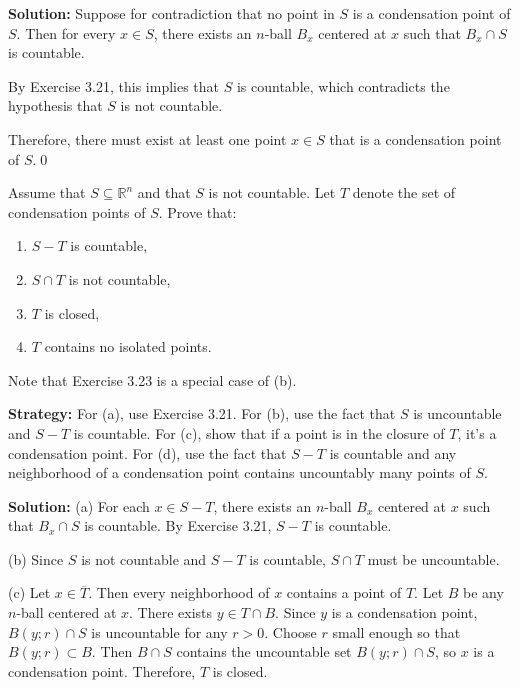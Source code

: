 \bigskip\noindent\textbf{Solution:} Suppose for contradiction that no point in $S$ is a condensation point of $S$. Then for every $x \in S$, there exists an $n$-ball $B_x$ centered at $x$ such that $B_x \cap S$ is countable.

By Exercise 3.21, this implies that $S$ is countable, which contradicts the hypothesis that $S$ is not countable.

Therefore, there must exist at least one point $x \in S$ that is a condensation point of $S$.\qed


\begin{problembox}
\begin{problemstatement}
Assume that \( S \subseteq \mathbb{R}^n \) and that \( S \) is not countable. Let \( T \) denote the set of condensation points of \( S \). Prove that:
\begin{enumerate}[label=\alph*)]
\item \( S - T \) is countable,
\item \( S \cap T \) is not countable,
\item \( T \) is closed,
\item \( T \) contains no isolated points.
\end{enumerate}
Note that Exercise 3.23 is a special case of (b).
\end{problemstatement}
\end{problembox}

\noindent\textbf{Strategy:} For (a), use Exercise 3.21. For (b), use the fact that $S$ is uncountable and $S-T$ is countable. For (c), show that if a point is in the closure of $T$, it's a condensation point. For (d), use the fact that $S-T$ is countable and any neighborhood of a condensation point contains uncountably many points of $S$.

\bigskip\noindent\textbf{Solution:} 
(a) For each $x \in S - T$, there exists an $n$-ball $B_x$ centered at $x$ such that $B_x \cap S$ is countable. By Exercise 3.21, $S - T$ is countable.

(b) Since $S$ is not countable and $S - T$ is countable, $S \cap T$ must be uncountable.

(c) Let $x \in \overline{T}$. Then every neighborhood of $x$ contains a point of $T$. Let $B$ be any $n$-ball centered at $x$. There exists $y \in T \cap B$. Since $y$ is a condensation point, $B(y;r) \cap S$ is uncountable for any $r > 0$. Choose $r$ small enough so that $B(y;r) \subset B$. Then $B \cap S$ contains the uncountable set $B(y;r) \cap S$, so $x$ is a condensation point. Therefore, $T$ is closed.

